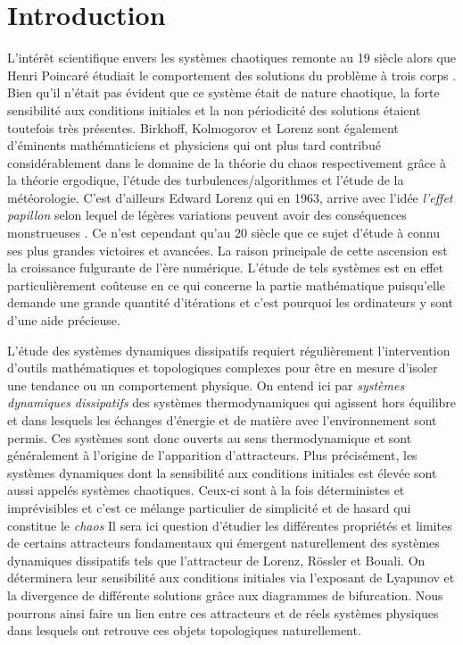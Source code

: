 \section{Introduction} \label{sec: introduction}

L'intérêt scientifique envers les systèmes chaotiques remonte au 19
siècle alors que Henri Poincaré étudiait le comportement des solutions du
problème à trois corps \cite{poin_carre}. Bien qu'il n'était pas évident que
ce système était de nature chaotique, la forte sensibilité aux conditions
initiales et la non périodicité des solutions étaient toutefois très présentes.
Birkhoff, Kolmogorov et Lorenz sont également d'éminents mathématiciens et
physiciens qui ont plus tard contribué considérablement dans le domaine de la
théorie du chaos respectivement grâce à la théorie ergodique, l'étude des
turbulences/algorithmes et l'étude de la météorologie. C'est d'ailleurs Edward
Lorenz qui en 1963, arrive avec l'idée \textit{l'effet papillon} selon lequel
de légères variations peuvent avoir des conséquences monstrueuses
\cite{butterfly}. Ce n'est cependant qu'au 20 siècle que ce sujet
d'étude à connu ses plus grandes victoires et avancées. La raison principale
de cette ascension est la croissance fulgurante de l'ère numérique. L'étude de
tels systèmes est en effet particulièrement coûteuse en ce qui concerne la
partie mathématique puisqu'elle demande une grande quantité d'itérations et
c'est pourquoi les ordinateurs y sont d'une aide précieuse.

L'étude des systèmes dynamiques dissipatifs requiert régulièrement
l'intervention d'outils mathématiques et topologiques complexes pour être en
mesure d'isoler une tendance ou un comportement physique. On entend ici par
\textit{systèmes dynamiques dissipatifs} des systèmes thermodynamiques qui
agissent hors équilibre et dans lesquels les échanges d'énergie et de matière
avec l'environnement sont permis. Ces systèmes sont donc ouverts au sens
thermodynamique et sont généralement à l'origine de l'apparition d'attracteurs.
Plus précisément, les systèmes dynamiques dont la sensibilité aux conditions
initiales est élevée sont aussi appelés systèmes chaotiques. Ceux-ci sont à la
fois déterministes et imprévisibles et c'est ce mélange particulier de
simplicité et de hasard qui constitue le \textit{chaos} Il sera ici question
d'étudier les différentes propriétés et limites de certains attracteurs
fondamentaux qui émergent naturellement des systèmes dynamiques dissipatifs
tels que l'attracteur de Lorenz, Rössler et Bouali. On déterminera leur
sensibilité aux conditions initiales via l'exposant de Lyapunov et la
divergence de différente solutions grâce aux diagrammes de bifurcation. Nous
pourrons ainsi faire un lien entre ces attracteurs et de réels systèmes
physiques dans lesquels ont retrouve ces objets topologiques naturellement.

